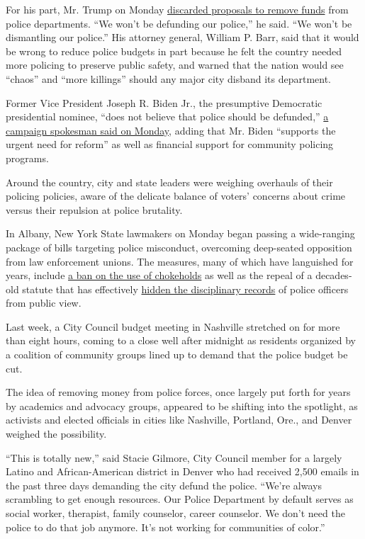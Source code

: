 For his part, Mr. Trump on Monday
\href{https://www.nytimes3xbfgragh.onion/2020/06/08/us/politics/defund-police-trump.html}{discarded
proposals to remove funds} from police departments. ``We won't be
defunding our police,'' he said. ``We won't be dismantling our police.''
His attorney general, William P. Barr, said that it would be wrong to
reduce police budgets in part because he felt the country needed more
policing to preserve public safety, and warned that the nation would see
``chaos'' and ``more killings'' should any major city disband its
department.

Former Vice President Joseph R. Biden Jr., the presumptive Democratic
presidential nominee, ``does not believe that police should be
defunded,''
\href{https://www.nytimes3xbfgragh.onion/2020/06/08/us/politics/biden-defund-the-police.html}{a
campaign spokesman said on Monday}, adding that Mr. Biden ``supports the
urgent need for reform'' as well as financial support for community
policing programs.

Around the country, city and state leaders were weighing overhauls of
their policing policies, aware of the delicate balance of voters'
concerns about crime versus their repulsion at police brutality.

In Albany, New York State lawmakers on Monday began passing a
wide-ranging package of bills targeting police misconduct, overcoming
deep-seated opposition from law enforcement unions. The measures, many
of which have languished for years, include
\href{https://www.nysenate.gov/legislation/bills/2019/s6670/amendment/b}{a
ban on the use of chokeholds} as well as the repeal of a decades-old
statute that has effectively
\href{https://www.nytimes3xbfgragh.onion/2020/06/05/nyregion/police-misconduct-records-are-secret-protests-may-finally-change-that.html}{hidden
the disciplinary records} of police officers from public view.

Last week, a City Council budget meeting in Nashville stretched on for
more than eight hours, coming to a close well after midnight as
residents organized by a coalition of community groups lined up to
demand that the police budget be cut.

The idea of removing money from police forces, once largely put forth
for years by academics and advocacy groups, appeared to be shifting into
the spotlight, as activists and elected officials in cities like
Nashville, Portland, Ore., and Denver weighed the possibility.

``This is totally new,'' said Stacie Gilmore, City Council member for a
largely Latino and African-American district in Denver who had received
2,500 emails in the past three days demanding the city defund the
police. ``We're always scrambling to get enough resources. Our Police
Department by default serves as social worker, therapist, family
counselor, career counselor. We don't need the police to do that job
anymore. It's not working for communities of color.''

